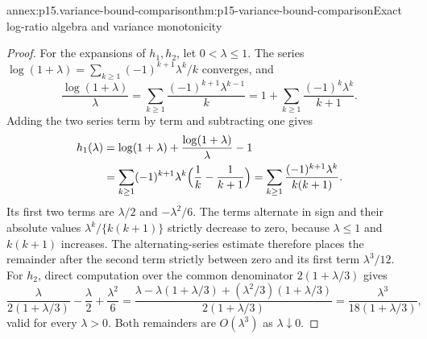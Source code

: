 \begin{annexitem}{annex:p15.variance-bound-comparison}{thm:p15-variance-bound-comparison}{Exact log-ratio algebra and variance monotonicity}
\begin{proof}
For the expansions of \(h_1,h_2\), let \(0<\lambda\leq1\). The series
\(\log(1+\lambda)=\sum_{k\geq1}(-1)^{k+1}\lambda^k/k\) converges, and
\[
 \frac{\log(1+\lambda)}\lambda
 =\sum_{k\geq1}\frac{(-1)^{k+1}\lambda^{k-1}}k
 =1+\sum_{k\geq1}\frac{(-1)^k\lambda^k}{k+1}.
\]
Adding the two series term by term and subtracting one gives
\[
\begin{split}
 h_1(\lambda)&=\log(1+\lambda)+\frac{\log(1+\lambda)}\lambda-1\\
 &=\sum_{k\geq1}(-1)^{k+1}\lambda^k\Bigl(\frac1k-\frac1{k+1}\Bigr)
 =\sum_{k\geq1}\frac{(-1)^{k+1}\lambda^k}{k(k+1)} .
\end{split}
\]
Its first two terms are \(\lambda/2\) and \(-\lambda^2/6\). The terms
alternate in sign and their absolute values
\(\lambda^k/\{k(k+1)\}\) strictly decrease to zero, because
\(\lambda\leq1\) and \(k(k+1)\) increases. The alternating-series
estimate therefore places the remainder after the second term strictly
between zero and its first term \(\lambda^3/12\). For \(h_2\), direct
computation over the common denominator \(2(1+\lambda/3)\) gives
\[
 \frac\lambda{2(1+\lambda/3)}-\frac\lambda2+\frac{\lambda^2}6
 =\frac{\lambda-\lambda(1+\lambda/3)+(\lambda^2/3)(1+\lambda/3)}
       {2(1+\lambda/3)}
 =\frac{\lambda^3}{18(1+\lambda/3)},
\]
valid for every \(\lambda>0\). Both remainders are \(O(\lambda^3)\) as
\(\lambda\downarrow0\).


\end{proof}
\end{annexitem}
